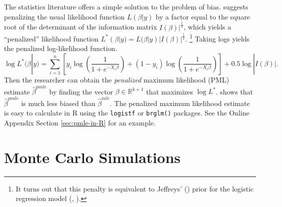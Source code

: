 \documentclass[12pt]{article}
\begin{document}
The statistics literature offers a simple solution to the problem of bias. 
\citet{Firth1993} suggests penalizing the usual likelihood function $L(\beta | y)$ by a factor equal to the square root of the determinant of the information matrix $I(\beta)|^\frac{1}{2}$, which yields a ``penalized'' likelihood function $L^*(\beta | y) = L(\beta | y)|I(\beta)|^\frac{1}{2}$.
\footnote{It turns out that this penalty is equivalent to Jeffreys' (\citeyear{Jeffreys1946}) prior for the logistic regression model (\citealt{Firth1993}, \citealt{Poirier1994}).} 
Taking logs yields the penalized log-likelihood function.
\begin{equation}\nonumber
\log L^*(\beta | y) = \displaystyle \sum_{i = 1}^n \left[y_i \log \left( \dfrac{1}{1 + e^{-X_i\beta}}\right) + (1 - y_i) \log \left( \dfrac{1}{1 + e^{-X_i\beta}}\right)\right] + 0.5 \log |I(\beta)|.
\end{equation}
Then the researcher can obtain the \emph{penalized} maximum likelihood (PML) estimate $\hat{\beta}^{pmle}$ by finding the vector $\beta \in \mathbb{R}^{k + 1}$ that maximizes $\log L^*$. 
\citet{Firth1993} shows that $\hat{\beta}^{pmle}$ is much less biased than $\hat{\beta}^{mle}$. 
The penalized maximum likelihood estimate is easy to calculate in R using the \texttt{logistf} or \texttt{brglm()} packages. 
See the Online Appendix Section \ref{sec:pmle-in-R} for an example.

\section*{Monte Carlo Simulations}
\end{document}
